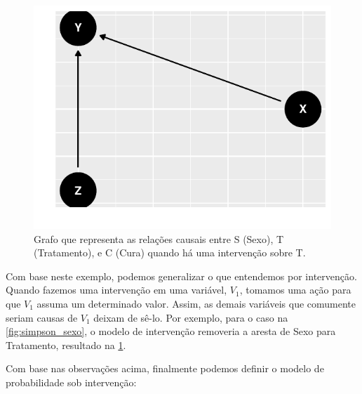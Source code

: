 \begin{knitrout}
\color{fgcolor}\begin{figure}

{\centering \includegraphics[width=\maxwidth]{./figures/simpson_sexo_inter-1} 

}

\caption[Grafo que representa as relações causais entre S (Sexo), T (Tratamento), e C (Cura) quando há uma intervenção sobre T]{Grafo que representa as relações causais entre S (Sexo), T (Tratamento), e C (Cura) quando há uma intervenção sobre T.}\label{fig:simpson_sexo_inter}
\end{figure}

\end{knitrout}


Com base neste exemplo, podemos generalizar
o que entendemos por intervenção.
Quando fazemos uma intervenção em uma variável, $V_1$,
tomamos uma ação para que $V_1$ assuma um determinado valor.
Assim, as demais variáveis que comumente seriam 
causas de $V_1$ deixam de sê-lo.
Por exemplo, para o caso na \cref{fig:simpson_sexo},
o modelo de intervenção removeria a aresta de
Sexo para Tratamento, resultado na \cref{fig:simpson_sexo_inter}.

Com base nas observações acima, finalmente
podemos definir o modelo de probabilidade sob intervenção:


